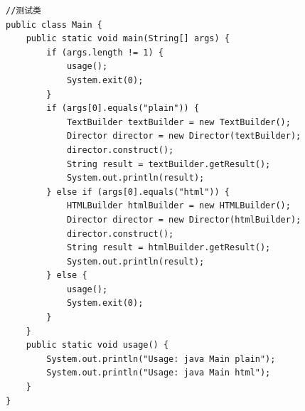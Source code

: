 \begin{lstlisting}
//测试类
public class Main {
	public static void main(String[] args) {
		if (args.length != 1) {
			usage();
			System.exit(0);
		}
		if (args[0].equals("plain")) {
			TextBuilder textBuilder = new TextBuilder();
			Director director = new Director(textBuilder);
			director.construct();
			String result = textBuilder.getResult();
			System.out.println(result);
		} else if (args[0].equals("html")) {
			HTMLBuilder htmlBuilder = new HTMLBuilder();
			Director director = new Director(htmlBuilder);
			director.construct();
			String result = htmlBuilder.getResult();
			System.out.println(result);
		} else {
			usage();
			System.exit(0);
		}
	}
	public static void usage() {
		System.out.println("Usage: java Main plain");
		System.out.println("Usage: java Main html");
	}
}
\end{lstlisting}
